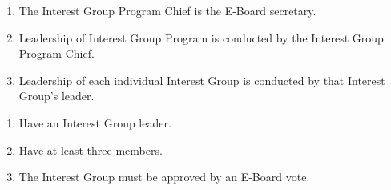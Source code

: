 
\begin{enumerate}
  \item The Interest Group Program Chief is the E-Board secretary.
  \item Leadership of Interest Group Program is conducted by the Interest Group
    Program Chief.
  \item Leadership of each individual Interest Group is conducted by that
    Interest Group's leader.
\end{enumerate}


\begin{enumerate}
  \item Have an Interest Group leader.
  \item Have at least three members. 
  \item The Interest Group must be approved by an E-Board vote.
\end{enumerate}
